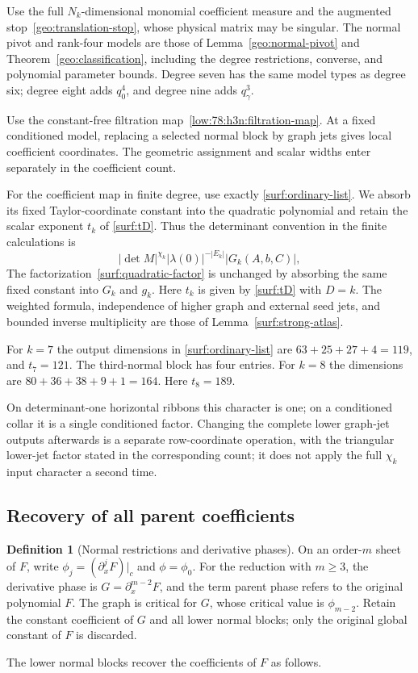 \documentclass[11pt]{amsart}
\theoremstyle{definition}
\newtheorem{definition}{Definition}[section]
\theoremstyle{remark}
\numberwithin{equation}{section}
\begin{document}
Use the full $N_k$-dimensional monomial coefficient measure and the augmented stop~\eqref{geo:translation-stop}, whose physical matrix may be singular. The normal pivot and rank-four models are those of Lemma~\ref{geo:normal-pivot} and Theorem~\ref{geo:classification}, including the degree restrictions, converse, and polynomial parameter bounds. Degree seven has the same model types as degree six; degree eight adds $q_0^4$, and degree nine adds $q_\gamma^3$.

Use the constant-free filtration map~\eqref{low:78:h3n:filtration-map}. At a fixed conditioned model, replacing a selected normal block by graph jets gives local coefficient coordinates. The geometric assignment and scalar widths enter separately in the coefficient count.

For the coefficient map in finite degree, use exactly \eqref{surf:ordinary-list}. We absorb its fixed Taylor-coordinate constant into the quadratic polynomial and retain the scalar exponent $t_k$ of \eqref{surf:tD}. Thus the determinant convention in the finite calculations is
\begin{equation}\label{low:78:h3n:exact-jac}
 |\det M|^{\chi_k}|\lambda(0)|^{-|E_k|}|G_k(A,b,C)|,
\end{equation}
The factorization~\eqref{surf:quadratic-factor} is unchanged by absorbing the same fixed constant into $G_k$ and $g_k$. Here $t_k$ is given by \eqref{surf:tD} with $D=k$. The weighted formula, independence of higher graph and external seed jets, and bounded inverse multiplicity are those of Lemma~\ref{surf:strong-atlas}.

For $k=7$ the output dimensions in \eqref{surf:ordinary-list} are $63+25+27+4=119$, and $t_7=121$. The third-normal block has four entries. For $k=8$ the dimensions are $80+36+38+9+1=164$. Here $t_8=189$.

On determinant-one horizontal ribbons this character is one; on a conditioned collar it is a single conditioned factor. Changing the complete lower graph-jet outputs afterwards is a separate row-coordinate operation, with the triangular lower-jet factor stated in the corresponding count; it does not apply the full $\chi_k$ input character a second time.

\subsection{Recovery of all parent coefficients}\label{atlas:parent}\label{low:78:smult:section}

\begin{definition}[Normal restrictions and derivative phases]\label{def:normal-restrictions}
On an order-$m$ sheet of $F$, write $\phi_j=(\partial_x^jF)|_c$ and $\phi=\phi_0$. For the reduction with $m\ge3$, the derivative phase is $G=\partial_x^{m-2}F$, and the term parent phase refers to the original polynomial $F$. The graph is critical for $G$, whose critical value is $\phi_{m-2}$. Retain the constant coefficient of $G$ and all lower normal blocks; only the original global constant of $F$ is discarded.
\end{definition}
The lower normal blocks recover the coefficients of $F$ as follows.
\end{document}
